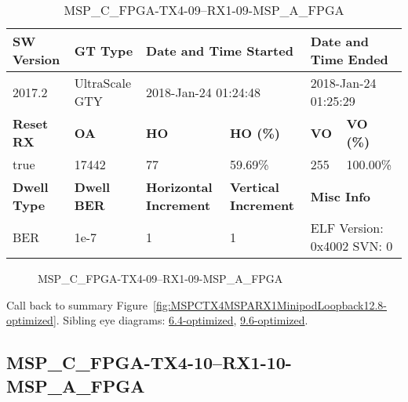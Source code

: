 \begin{table}[h]
\centering
\caption{MSP\_C\_FPGA-TX4-09--RX1-09-MSP\_A\_FPGA}
\label{tab:MSPCFPGATX409RX109MSPAFPGA12.8-optimized}
\begin{tabular}{@{}|l|l|l|l|l|l|@{}}
\toprule
\textbf{SW Version}                & \textbf{GT Type}   & \multicolumn{2}{l|}{\textbf{Date and Time Started}}            & \multicolumn{2}{l|}{\textbf{Date and Time Ended}}        \\ \midrule
2017.2                       & UltraScale GTY          & \multicolumn{2}{l|}{2018-Jan-24 01:24:48}                   & \multicolumn{2}{l|}{2018-Jan-24 01:25:29}               \\ \midrule
\textbf{Reset RX}                  & \textbf{OA} & \textbf{HO}   & \textbf{HO (\%)} & \textbf{VO} & \textbf{VO (\%)} \\ \midrule
true & 17442        & 77          & 59.69\%        & 255        & 100.00\%       \\ \midrule
\textbf{Dwell Type}                & \textbf{Dwell BER} & \textbf{Horizontal Increment} & \textbf{Vertical Increment}    & \multicolumn{2}{l|}{\textbf{Misc Info}}                  \\ \midrule
BER                            & 1e-7        & 1        & 1           & \multicolumn{2}{l|}{ELF Version: 0x4002 SVN: 0}                         \\ \bottomrule
\end{tabular}
\end{table}

\begin{figure}[h]
\caption{MSP\_C\_FPGA-TX4-09--RX1-09-MSP\_A\_FPGA} \label{fig:MSPCFPGATX409RX109MSPAFPGA12.8-optimized}
\end{figure}

Call back to summary Figure~\ref{fig:MSPCTX4MSPARX1MinipodLoopback12.8-optimized}.
Sibling eye diagrams: \hyperref[sec:MSPCFPGATX409RX109MSPAFPGA6.4-optimized]{6.4-optimized}, \hyperref[sec:MSPCFPGATX409RX109MSPAFPGA9.6-optimized]{9.6-optimized}.

\clearpage
\newpage


\subsection{MSP\_C\_FPGA-TX4-10--RX1-10-MSP\_A\_FPGA}\label{sec:MSPCFPGATX410RX110MSPAFPGA12.8-optimized}

